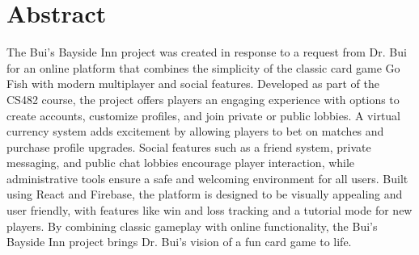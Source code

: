 \clearpage
\section{Abstract}
The Bui’s Bayside Inn project was created in response to a request from Dr. Bui for an online platform that combines the simplicity of the classic card game Go Fish with modern multiplayer and social features. Developed as part of the CS482 course, the project offers players an engaging experience with options to create accounts, customize profiles, and join private or public lobbies. A virtual currency system adds excitement by allowing players to bet on matches and purchase profile upgrades. Social features such as a friend system, private messaging, and public chat lobbies encourage player interaction, while administrative tools ensure a safe and welcoming environment for all users. Built using React and Firebase, the platform is designed to be visually appealing and user friendly, with features like win and loss tracking and a tutorial mode for new players. By combining classic gameplay with online functionality, the Bui’s Bayside Inn project brings Dr. Bui’s vision of a fun card game to life.